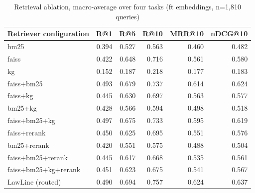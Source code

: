 \begin{table}
\caption{Retrieval ablation, macro-average over four tasks (ft embeddings, n=1,810 queries)}
\label{tab:ablation_ft}
\begin{tabular}{lrrrrr}
\toprule
Retriever configuration & R@1 & R@5 & R@10 & MRR@10 & nDCG@10 \\
\midrule
bm25 & 0.394 & 0.527 & 0.563 & 0.460 & 0.482 \\
faiss & 0.422 & 0.648 & 0.716 & 0.561 & 0.580 \\
kg & 0.152 & 0.187 & 0.218 & 0.177 & 0.183 \\
faiss+bm25 & 0.493 & 0.679 & 0.737 & 0.614 & 0.624 \\
faiss+kg & 0.445 & 0.630 & 0.697 & 0.563 & 0.577 \\
bm25+kg & 0.428 & 0.566 & 0.594 & 0.498 & 0.518 \\
faiss+bm25+kg & 0.497 & 0.675 & 0.733 & 0.595 & 0.619 \\
faiss+rerank & 0.450 & 0.625 & 0.695 & 0.551 & 0.576 \\
bm25+rerank & 0.420 & 0.551 & 0.575 & 0.488 & 0.504 \\
faiss+bm25+rerank & 0.445 & 0.617 & 0.668 & 0.535 & 0.561 \\
faiss+bm25+kg+rerank & 0.451 & 0.623 & 0.675 & 0.541 & 0.567 \\
LawLine (routed) & 0.490 & 0.694 & 0.757 & 0.624 & 0.637 \\
\bottomrule
\end{tabular}
\end{table}
